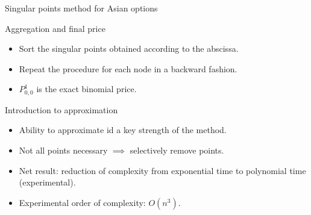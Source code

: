 \documentclass[utf8,t,compress,xcolor=svgnames,handout]{beamer}
\begin{document}
	
	\begin{frame}{Singular points method for Asian options}
		\begin{block}{Aggregation and final price}
			\begin{itemize}
				\item Sort the singular points obtained according to the abscissa.
				\item Repeat the procedure for each node in a backward fashion.
				\item $ P_{0,0}^1 $ is the exact binomial price.
			\end{itemize}
		\end{block}
		\begin{block}{Introduction to approximation}
			\begin{itemize}
				\item Ability to approximate id a key strength of the method.
				\item Not all points necessary $ \implies $ selectively remove points.
				\item Net result: reduction of complexity from exponential time to polynomial time (experimental).
				\item Experimental order of complexity: $ O(n^3) $.
			\end{itemize}
		\end{block}
	\end{frame}
	
\end{document}
